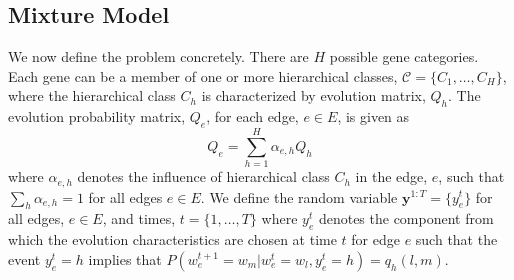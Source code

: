 \documentclass{bioinfo}
\begin{document}
\begin{methods}
\subsection{Mixture Model}
\label{sec:mixture-model}
We now define the problem concretely. There are $H$ possible gene
categories. Each gene can be a member of one or more hierarchical
classes, $\mathcal{C}=\{C_{1},\ldots , C_{H}\}$, where the
hierarchical class $C_{h}$ is characterized by evolution matrix,
$Q_{h}$. The evolution probability matrix, $Q_{e}$, for each edge,
$e\in E$, is given as 
\begin{equation}
  \label{eq:q-mixture}
  Q_{e} = \sum_{h=1}^{H} \alpha_{e,h} Q_{h}
\end{equation}
where $\alpha_{e,h}$ denotes the influence of hierarchical class
$C_{h}$ in the edge, $e$, such that $\sum_{h} \alpha_{e, h} = 1$
for all edges $e \in E$. We define the random variable
$\mathbf{y}^{1:T} = \{y_e^t\}$ for all edges, $e \in E$,  and times,
$t=\{1,\ldots, T\}$ where $y^t_e$
denotes the component from which the evolution characteristics are
chosen at time $t$ for edge $e$ such that the event $y_e^t = h$
implies that $P(w_e^{t+1}= w_m | w^t_e =w_l, y_e^t = h) = q_h(l, m)$.


\end{methods}
\end{document}
